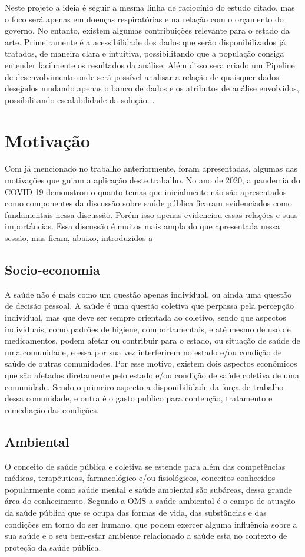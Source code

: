 \documentclass[journal]{IEEEtran}
\begin{document}
Neste projeto a ideia é seguir a mesma linha de raciocínio do estudo citado, mas o foco será apenas em doenças respiratórias e na relação com o orçamento do governo. No entanto, existem algumas contribuições relevante para o estado da arte. Primeiramente é a acessibilidade dos dados que serão disponibilizados já tratados, de maneira clara e intuitiva, possibilitando que a população consiga entender facilmente os resultados da análise. Além disso sera criado um Pipeline de desenvolvimento onde será possível analisar a relação de quaisquer dados desejados mudando apenas o banco de dados e os atributos de análise envolvidos, possibilitando escalabilidade da solução.  \cite{estado_arte}.

\section{Motivação} 
Com já mencionado no trabalho anteriormente, foram apresentadas, algumas das motivações que guiam a aplicação deste trabalho. 
No ano de 2020, a pandemia do COVID-19 demonstrou o quanto temas que inicialmente não são apresentados como componentes da discussão sobre saúde pública ficaram evidenciados como fundamentais nessa discussão. Porém isso apenas evidenciou essas relações e suas importâncias. Essa discussão é muitos mais ampla do que apresentada nessa sessão, mas ficam, abaixo, introduzidos a
\subsection{Socio-economia}
A saúde não é mais como um questão apenas individual, ou ainda uma questão de decisão pessoal. A saúde é uma questão coletiva \cite{saude_coletiva} que perpassa pela percepção individual, mas que deve ser sempre orientada ao coletivo, sendo que aspectos individuais, como padrões de higiene, comportamentais, e até mesmo de uso de medicamentos, podem afetar ou contribuir para o estado, ou situação de saúde de uma comunidade, e essa por sua vez interferirem no estado e/ou condição de saúde de outras comunidades.
Por esse motivo, existem dois aspectos econômicos \cite{saude_forca_trabalho} que são afetados diretamente pelo estado e/ou condição de saúde coletiva de uma comunidade. Sendo o primeiro aspecto a disponibilidade da força de trabalho dessa comunidade, e outra é o gasto publico para contenção, tratamento e remediação das condições.
\subsection{Ambiental}
O conceito de saúde pública e coletiva se estende para além das competências médicas, terapêuticas, farmacológico e/ou fisiológicos, conceitos conhecidos popularmente como saúde mental e saúde ambiental são subáreas, dessa grande área do conhecimento.
Segundo a OMS a saúde ambiental é o campo de atuação da saúde pública que se ocupa das formas de vida, das substâncias e das condições em torno do ser humano, que podem exercer alguma influência sobre a sua saúde e o seu bem-estar \cite{ms_oms} ambiente relacionado a saúde esta no contexto de proteção da saúde pública. 
\end{document}

